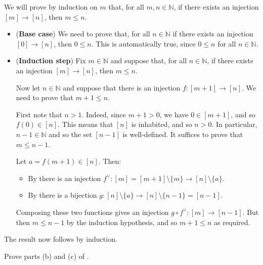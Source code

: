 \begin{cproof}[of (a)]
We will prove by induction on $m$ that, for all $m,n \in \mathbb{N}$, if there exists an injection $[m] \to [n]$, then $m \le n$.

\begin{itemize}
\item (\textbf{Base case}) We need to prove that, for all $n \in \mathbb{N}$ if there exists an injection $[0] \to [n]$, then $0 \le n$. This is automatically true, since $0 \le n$ for all $n \in \mathbb{N}$.
\item (\textbf{Induction step}) Fix $m \in \mathbb{N}$ and suppose that, for all $n \in \mathbb{N}$, if there exists an injection $[m] \to [n]$, then $m \le n$.

Now let $n \in \mathbb{N}$ and suppose that there is an injection $f : [m+1] \to [n]$. We need to prove that $m+1 \le n$.

First note that $n > 1$. Indeed, since $m+1 > 0$, we have $0 \in [m+1]$, and so $f(0) \in [n]$. This means that $[n]$ is inhabited, and so $n > 0$. In particular, $n-1 \in \mathbb{N}$ and so the set $[n-1]$ is well-defined. It suffices to prove that $m \le n-1$.

Let $a = f(m+1) \in [n]$. Then:
\begin{itemize}
\item By  there is an injection $f^{\vee} : [m] = [m+1] \setminus \{ m \} \to [n] \setminus \{ a \}$.
\item By  there is a bijection $g : [n] \setminus \{ a \} \to [n] \setminus \{ n-1 \} = [n-1]$.
\end{itemize}

Composing these two functions gives an injection $g \circ f^{\vee} : [m] \to [n-1]$. But then $m \le n-1$ by the induction hypothesis, and so $m+1 \le n$ as required.
\end{itemize}
The result now follows by induction.
\end{cproof}

\begin{exercise}
Prove parts (b) and (c) of .
\end{exercise}

